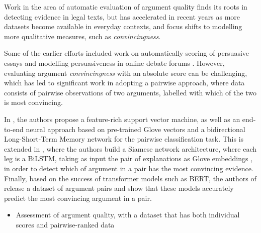 \documentclass[runningheads]{llncs}
\begin{document}
Work in the area of automatic evaluation of argument quality finds its roots in 
 detecting evidence in legal texts\cite{moens_automatic_2007}, but has 
 accelerated in recent years as more datasets become 
available in everyday contexts, and focus shifts to modelling more qualitative 
measures, such as \textit{convincingness}. 

Some of the earlier efforts included work on automatically 
scoring of persuasive essays \cite{persing_end--end_2016} and modelling 
persuasiveness in online debate forums \cite{tan_winning_2016}. However, 
evaluating argument \textit{convincingness} with an absolute score can be 
challenging, which has led to significant work in adopting a pairwise approach, 
where data consists of pairwise observations of two arguments, labelled with 
which of the two is most convincing.


	
	
	
	

In \cite{habernal_which_2016}, the authors propose a feature-rich support 
vector machine, as well as an end-to-end neural approach based on pre-trained 
Glove vectors and a bidirectional Long-Short-Term Memory network for the 
pairwise classification task. This is extended in \cite{gleize_are_2019}, where 
the authors build a Siamese network architecture, where each leg is a BiLSTM, 
taking as input the pair of explanations as Glove embeddings 
\cite{pennington_glove:_2014}, in order to detect which of argument in a pair 
has the most convincing evidence. Finally, based on the success of transformer 
models such as BERT\cite{devlin_bert_2018}, the authors of 
\cite{toledo_automatic_2019} 
release a dataset of argument pairs and show that these models accurately 
predict the most convincing argument in a pair.



\begin{itemize}

	\item \cite{toledo_automatic_2019} Assessment of argument quality, with a 
	dataset that has both individual scores 
	and pairwise-ranked data 
	
\end{itemize}
  
\end{document}
